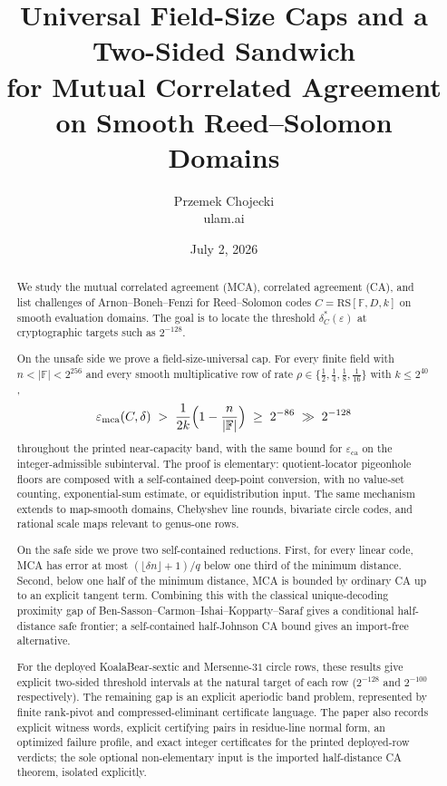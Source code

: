 \documentclass[11pt]{article}
\title{Universal Field-Size Caps and a Two-Sided Sandwich\\ for Mutual Correlated Agreement on Smooth Reed--Solomon Domains}
\author{Przemek Chojecki\\ \small ulam.ai}
\date{July 2, 2026}
\theoremstyle{definition}
\theoremstyle{remark}
\newcommand{\F}{\mathbb{F}}
\newcommand{\RS}{\mathrm{RS}}
\newcommand{\eca}{\varepsilon_{\mathrm{ca}}}
\newcommand{\emca}{\varepsilon_{\mathrm{mca}}}
\begin{document}
\maketitle

\begin{abstract}
We study the mutual correlated agreement (MCA), correlated agreement (CA), and list challenges of Arnon--Boneh--Fenzi \cite{ABF26} for Reed--Solomon codes $C=\RS[\F,D,k]$ on smooth evaluation domains.  The goal is to locate the threshold $\delta_C^*(\varepsilon)$ at cryptographic targets such as $2^{-128}$.

On the unsafe side we prove a field-size-universal cap.  For every finite field with $n<|\F|<2^{256}$ and every smooth multiplicative row of rate $\rho\in\{\frac12,\frac14,\frac18,\frac1{16}\}$ with $k\le2^{40}$,
\[
\emca(C,\delta)\;>\;\frac1{2k}\Bigl(1-\frac n{|\F|}\Bigr)\;\ge\;2^{-86}\;\gg\;2^{-128}
\]
throughout the printed near-capacity band, with the same bound for $\eca$ on the integer-admissible subinterval.  The proof is elementary: quotient-locator pigeonhole floors are composed with a self-contained deep-point conversion, with no value-set counting, exponential-sum estimate, or equidistribution input.  The same mechanism extends to map-smooth domains, Chebyshev line rounds, bivariate circle codes, and rational scale maps relevant to genus-one rows.

On the safe side we prove two self-contained reductions.  First, for every linear code, MCA has error at most $(\lfloor\delta n\rfloor+1)/q$ below one third of the minimum distance.  Second, below one half of the minimum distance, MCA is bounded by ordinary CA up to an explicit tangent term.  Combining this with the classical unique-decoding proximity gap of Ben-Sasson--Carmon--Ishai--Kopparty--Saraf \cite{BCIKS20} gives a conditional half-distance safe frontier; a self-contained half-Johnson CA bound gives an import-free alternative.

For the deployed KoalaBear-sextic and Mersenne-$31$ circle rows, these results give explicit two-sided threshold intervals at the natural target of each row ($2^{-128}$ and $2^{-100}$ respectively).  The remaining gap is an explicit aperiodic band problem, represented by finite rank-pivot and compressed-eliminant certificate language.  The paper also records explicit witness words, explicit certifying pairs in residue-line normal form, an optimized failure profile, and exact integer certificates for the printed deployed-row verdicts; the sole optional non-elementary input is the imported half-distance CA theorem, isolated explicitly.
\end{abstract}
\end{document}

